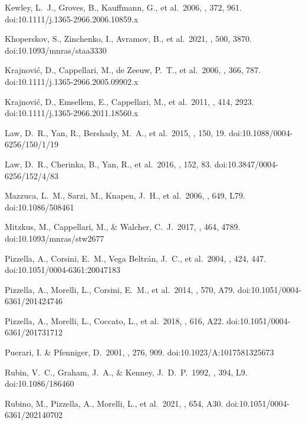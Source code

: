 \documentclass{aastex631}
\begin{document}
\begin{thebibliography}{}
 Kewley, L.~J., Groves, B., Kauffmann, G., et al.\ 2006, \mnras, 372, 961. doi:10.1111/j.1365-2966.2006.10859.x

 Khoperskov, S., Zinchenko, I., Avramov, B., et al.\ 2021, \mnras, 500, 3870. doi:10.1093/mnras/staa3330

 Krajnovi{\'c}, D., Cappellari, M., de Zeeuw, P.~T., et al.\ 2006, \mnras, 366, 787. doi:10.1111/j.1365-2966.2005.09902.x

 Krajnovi{\'c}, D., Emsellem, E., Cappellari, M., et al.\ 2011, \mnras, 414, 2923. doi:10.1111/j.1365-2966.2011.18560.x

 Law, D.~R., Yan, R., Bershady, M.~A., et al.\ 2015, \aj, 150, 19. doi:10.1088/0004-6256/150/1/19

 Law, D.~R., Cherinka, B., Yan, R., et al.\ 2016, \aj, 152, 83. doi:10.3847/0004-6256/152/4/83

 Mazzuca, L.~M., Sarzi, M., Knapen, J.~H., et al.\ 2006, \apjl, 649, L79. doi:10.1086/508461

 Mitzkus, M., Cappellari, M., \& Walcher, C.~J.\ 2017, \mnras, 464, 4789. doi:10.1093/mnras/stw2677

 Pizzella, A., Corsini, E.~M., Vega Beltr{\'a}n, J.~C., et al.\ 2004, \aap, 424, 447. doi:10.1051/0004-6361:20047183

 Pizzella, A., Morelli, L., Corsini, E.~M., et al.\ 2014, \aap, 570, A79. doi:10.1051/0004-6361/201424746

 Pizzella, A., Morelli, L., Coccato, L., et al.\ 2018, \aap, 616, A22. doi:10.1051/0004-6361/201731712

 Puerari, I. \& Pfenniger, D.\ 2001, \apss, 276, 909. doi:10.1023/A:1017581325673

 Rubin, V.~C., Graham, J.~A., \& Kenney, J.~D.~P.\ 1992, \apjl, 394, L9. doi:10.1086/186460

 Rubino, M., Pizzella, A., Morelli, L., et al.\ 2021, \aap, 654, A30. doi:10.1051/0004-6361/202140702


\end{thebibliography}
\end{document}

